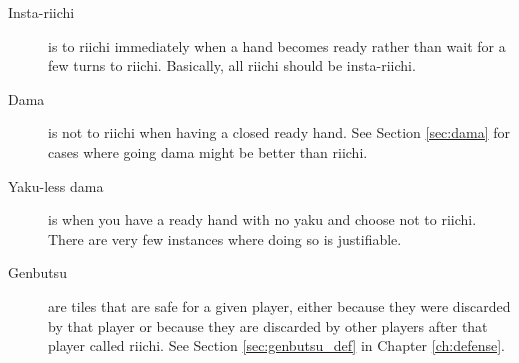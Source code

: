 \begin{description}
\item[Insta-{\jap riichi}] is to {\jap riichi} immediately when a hand becomes ready rather than wait for a few turns to {\jap riichi}. Basically, all {\jap riichi} should be insta-{\jap riichi}.
\item[{\jap Dama}] is not to {\jap riichi} when having a closed ready hand. See Section \ref{sec:dama} for cases where going {\jap dama} might be better than {\jap riichi}. 
\item[{\jap Yaku}-less {\jap dama}] is when you have a ready hand with no {\jap yaku} and choose not to {\jap riichi}. There are very few instances where doing so is justifiable. 
\item[{\jap Genbutsu}] are tiles that are safe for a given player, either because they were discarded by that player or because they are discarded by other players after that player called {\jap riichi}. See Section \ref{sec:genbutsu_def} in Chapter \ref{ch:defense}.
\end{description}

